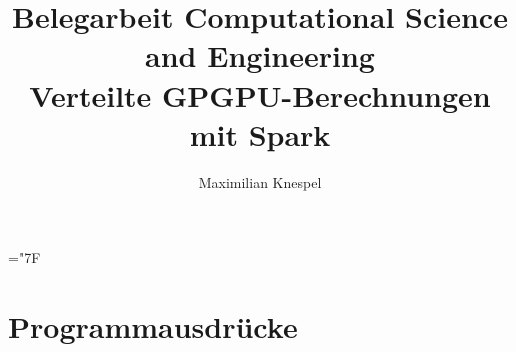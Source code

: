 \documentclass[german,bibnum,beleg,zihtitle,german,hyperref,utf8]{zihpub}
\author{Maximilian Knespel}
\title{Belegarbeit Computational Science and Engineering\\Verteilte GPGPU-Berechnungen mit Spark }
\date{}
\begin{document}
\hyphenchar\font=\string"7F %












\appendix




\chapter{Programmausdrücke}





\end{document}
